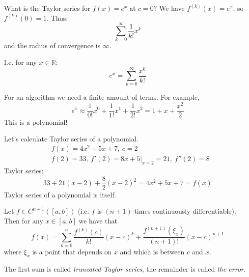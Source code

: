 \begin{example}[1]
    What is the Taylor series for $f(x) = e^x$ at $c = 0$?
    We have $f^{(k)}(x) = e^x$, so $f^{(k)}(0) = 1$.
    Thus: \[
        \sum_{k = 0}^{\infty} \frac{1}{k!} x^k
    \]
    and the radius of convergence is $\infty$.

    I.e. for any $x \in \mathbb{R}$:
    \[e^x = \sum_{k = 0}^{\infty} \frac{x^k}{k!}\]

    For an algorithm we need a finite amount of terms. For example,
    \[
        e^x \approx \frac{1}{0!} x^0 + \frac{1}{1!} x^1 + \frac{1}{2!} x^2 =
        1 + x + \frac{x^2}{2}
    \]
    This is a polynomial!
\end{example}

\begin{example}[2]
    Let's calculate Taylor series of a polynomial.
    \begin{align*}
        &
        f(x) = 4x^2 + 5x + 7,\ c = 2
        \\&
        f(2) = 33,\ f'(2) = 8x + 5\Big|_{x = 2} = 21,\ f''(2) = 8
    \end{align*}
    Taylor series:
    \[
        33 + 21(x - 2) + \frac{8}{2} (x - 2)^2 = 4x^2 + 5x + 7 = f(x)
    \]
    Taylor series of a polynomial is itself.
\end{example}

\begin{theorem}
    Let $f \in C^{n + 1}([a, b])$ (i.e. $f$ is $(n+1)$-times
    continuously differentiable).
    Then for any $x \in [a, b]$ we have that 
    \[
        f(x) = \sum_{k=0}^n \frac{f^{(k)}(c)}{k!}(x - c)^k +
        \frac{f^{(n+1)}(\xi_x)}{(n+1)!} (x - c)^{n+1}
    \]
    where $\xi_x$ is a point that depends on $x$ and which is between $c$ and $x$.

    The first sum is called \textit{truncated Taylor series}, the remainder is called \textit{the error}.
\end{theorem}